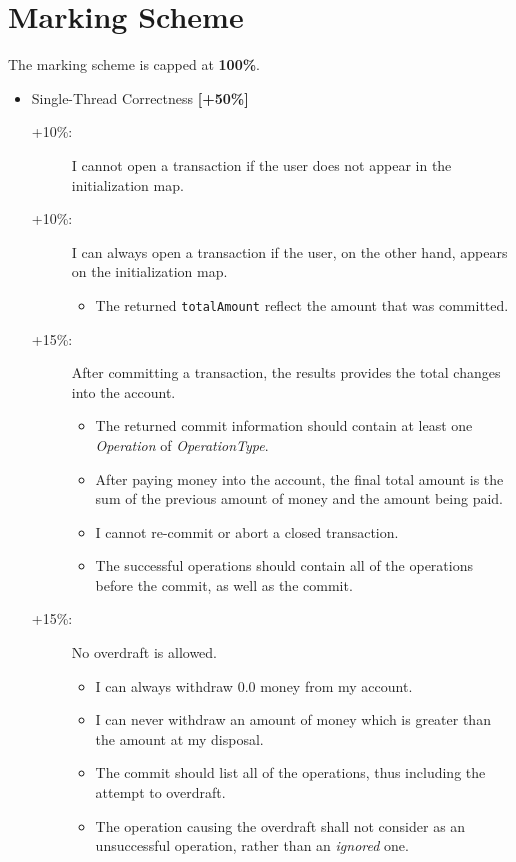 \documentclass{article}
\begin{document}
	\section*{Marking Scheme}
	The marking scheme is capped at  \textbf{100\%}.
	\begin{itemize}
		\item Single-Thread Correctness \textbf{[+50\%]}
			\begin{description}
			\item [+10\%:] I cannot open a transaction if the user does not appear in the initialization map.
			\item [+10\%:] I can always open a transaction if the user, on the other hand, appears on the initialization map.
			\begin{itemize}
				\item The returned \texttt{totalAmount} reflect the amount that was committed.
			\end{itemize}
			\item [+15\%:] After committing a transaction, the results provides the total changes into the account.
			\begin{itemize}
				\item The returned commit information should contain at least one \textit{Operation} of \textit{OperationType}.
				\item After paying money into the account, the final total amount is the sum of the previous amount of money and the amount being paid.
				\item I cannot re-commit or abort a closed transaction.
				\item The successful operations should contain all of the operations before the commit, as well as the commit.
			\end{itemize}
			\item [+15\%: ] No overdraft is allowed.
			\begin{itemize}
				\item I can always withdraw $0.0$ money from my account.
				\item I can never withdraw an amount of money which is greater than the amount at my disposal.
				\item The commit should list all of the operations, thus including the attempt to overdraft.
				\item The operation causing the overdraft shall not consider as an unsuccessful operation, rather than an \textit{ignored} one.
			\end{itemize}
	

\end{description}
\end{itemize}
\end{document}

